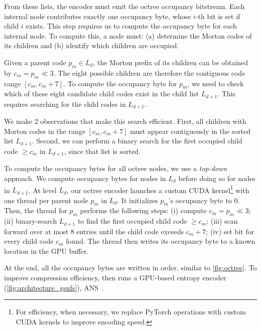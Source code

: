 %
From these lists, the encoder must emit the octree occupancy bitstream.
%
Each internal node contributes exactly one occupancy byte, whose $i$-th bit is set if child $i$ exists.
%
This step requires us to compute the occupancy byte for each internal node.
%
To compute this, a node must: (a) determine the Morton codes of its children and (b) identify which children are occupied.

Given a parent code $p_m\in L_d$, the Morton prefix of its children can be obtained by $c_m = p_m \ll 3$.
%
The eight possible children are therefore the contiguous code range $[c_m,c_m+7]$.
%
To compute the occupancy byte for $p_m$, we need to check which of these eight candidate child codes exist in the child list $L_{d+1}$.
%
This requires searching for the child codes in $L_{d+1}$.

We make 2 observations that make this search efficient. 
%
First, all children with Morton codes in the range $[c_m,c_m+7]$ must appear contiguously in the sorted list $L_{d+1}$.
%
Second, we can perform a binary search for the first occupied child code $\geq c_m$ in $L_{d+1}$, since that list is sorted.

To compute the occupancy bytes for all octree nodes, we use a \textit{top-down} approach.
%
We compute occupancy bytes for nodes in $L_d$ before doing so for nodes in $L_{d+1}$.
%
At level $L_d$, our octree encoder launches a custom CUDA kernel\footnote{For efficiency, when necessary, we replace PyTorch operations with custom CUDA kernels to improve encoding speed.}
with one thread per parent node $p_m$ in $L_d$.
%
It initializes $p_m$'s occupancy byte to 0.
%
Then, the thread for $p_m$ performs the following steps:
(i) compute $c_m = p_m \ll 3$;
(ii) binary-search $L_{d+1}$ to find the first occupied child code $\geq c_m$;
(iii) scan forward over at most 8 entries until the child code exceeds $c_m+7$;
(iv) set bit for every child code $c_m$ found.
%
The thread then writes its occupancy byte to a known location in the GPU buffer.


At the end, all the occupancy bytes are written in order, similar to \cref{fig:octree}.
%
To improve compression efficiency, \gsnfs{} then runs a GPU-based entropy encoder (\cref{fig:architecture_gsnfs}), ANS~\cite{nvidia_nvcomp}.

